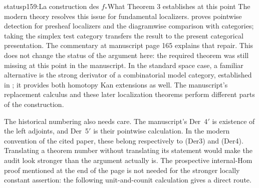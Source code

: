 \begin{dcomment}{status}{p159:La construction des $f_*$}{What Theorem 3 establishes at this point}
The modern theory resolves this issue for fundamental localizers. \citet[Propositions~3.1.30 and 4.2.7]{Cisinski2006} proves pointwise detection for presheaf localizers and the diagramwise comparison with categories; taking the simplex test category transfers the result to the present categorical presentation. The commentary at manuscript page 165 explains that repair. This does not change the status of the argument here: the required theorem was still missing at this point in the manuscript. In the standard space case, a familiar alternative is the strong derivator of a combinatorial model category, established in \citet[Proposition~1.30]{Groth2013}; it provides both homotopy Kan extensions as well. The manuscript's replacement calculus and these later localization theorems perform different parts of the construction.

The historical numbering also needs care. The manuscript's Der~4$'$ is existence of the left adjoints, and Der~5$'$ is their pointwise calculation. In the modern convention of the cited paper, these belong respectively to (Der3) and (Der4). Translating a theorem number without translating its statement would make the audit look stronger than the argument actually is. The prospective internal-Hom proof mentioned at the end of the page is not needed for the stronger locally constant assertion: the following unit-and-counit calculation gives a direct route.
\end{dcomment}


